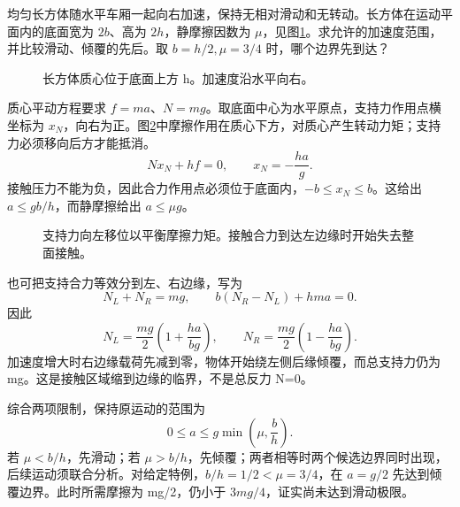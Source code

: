 \begin{exercise}[滑动与倾覆的先后]\label{sup2:problem-exercise-8}\label{sup2:exercise:d2-h8}

均匀长方体随水平车厢一起向右加速，保持无相对滑动和无转动。长方体在运动平面内的底面宽为 $2b$、高为 $2h$，静摩擦因数为 $\mu$，见图\ref{sup2:fig:d2-h8-q}。求允许的加速度范围，并比较滑动、倾覆的先后。取 $b=h/2,\mu=3/4$ 时，哪个边界先到达？

\end{exercise}
\begin{figure}[H]\centering
{}
\caption{长方体质心位于底面上方 h。加速度沿水平向右。}\label{sup2:fig:d2-h8-q}
\end{figure}
\par\medskip

\begin{solution}
质心平动方程要求 $f=ma$、$N=mg$。取底面中心为水平原点，支持力作用点横坐标为 $x_N$，向右为正。图\ref{sup2:fig:d2-h8-s}中摩擦作用在质心下方，对质心产生转动力矩；支持力必须移向后方才能抵消。
\[
Nx_N+hf=0,\qquad x_N=-\frac{ha}{g}.
\]
接触压力不能为负，因此合力作用点必须位于底面内，$-b\le x_N\le b$。这给出 $a\le gb/h$，而静摩擦给出 $a\le\mu g$。

\begin{figure}[H]\centering
{}
\caption{支持力向左移位以平衡摩擦力矩。接触合力到达左边缘时开始失去整面接触。}\label{sup2:fig:d2-h8-s}
\end{figure}

也可把支持合力等效分到左、右边缘，写为
\[
N_L+N_R=mg,\qquad b(N_R-N_L)+hma=0.
\]
因此
\[
N_L=\frac{mg}{2}\left(1+\frac{ha}{bg}\right),\qquad
N_R=\frac{mg}{2}\left(1-\frac{ha}{bg}\right).
\]
加速度增大时右边缘载荷先减到零，物体开始绕左侧后缘倾覆，而总支持力仍为 mg。这是接触区域缩到边缘的临界，不是总反力 N=0。

综合两项限制，保持原运动的范围为
\[
0\le a\le g\min\left(\mu,\frac bh\right).
\]
若 $\mu<b/h$，先滑动；若 $\mu>b/h$，先倾覆；两者相等时两个候选边界同时出现，后续运动须联合分析。对给定特例，$b/h=1/2<\mu=3/4$，在 $a=g/2$ 先达到倾覆边界。此时所需摩擦为 mg/2，仍小于 $3mg/4$，证实尚未达到滑动极限。

\end{solution}


